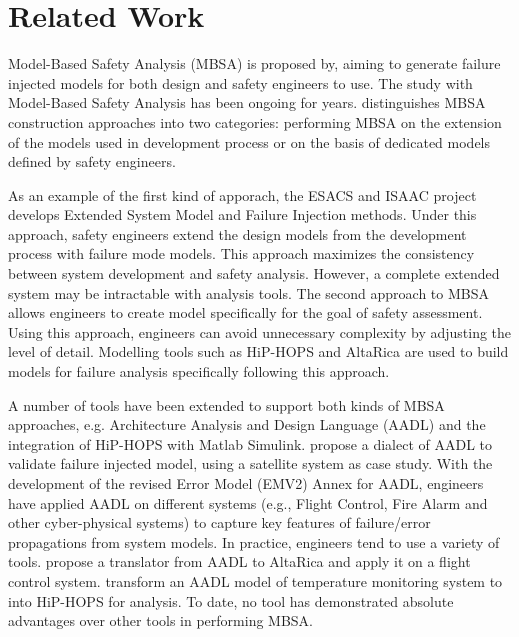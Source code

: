 \section{Related Work}
Model-Based Safety Analysis (MBSA) is proposed by\cite{mbsa05}, aiming to generate failure injected models for both design and safety engineers to use. The study with Model-Based Safety Analysis has been ongoing for years. \cite{mbsa11} distinguishes MBSA construction approaches into two categories: performing MBSA on the extension of the models used in development process or on the basis of dedicated models defined by safety engineers.

As an example of the first kind of apporach, the ESACS and ISAAC project develops Extended System Model and Failure Injection methods\cite{erts06,esrel03}. Under this approach, safety engineers extend the design models from the development process with failure mode models. This approach maximizes the consistency between system development and safety analysis. However, a complete extended system may be intractable with analysis tools. The second approach to MBSA allows engineers to create model specifically for the goal of safety assessment. Using this approach, engineers can avoid unnecessary complexity by adjusting the level of detail. Modelling tools such as HiP-HOPS and AltaRica are used to build models for failure analysis specifically following this approach. 



A number of tools have been extended to support both kinds of MBSA approaches, e.g. Architecture Analysis and Design Language (AADL)\cite{cmu07,sae11} and the integration of HiP-HOPS with Matlab Simulink\cite{dsn01}. \cite{aadl13} propose a dialect of AADL to validate failure injected model, using a satellite system as case study. With the development of the revised Error Model (EMV2) Annex\cite{aadlemv2} for AADL, engineers have applied AADL on different systems (e.g., Flight Control\cite{field1}, Fire Alarm\cite{field2} and other cyber-physical systems\cite{field3}) to capture key features of failure/error propagations from system models. In practice, engineers tend to use a variety of tools. \cite{aadl_altarica} propose a translator from AADL to AltaRica and apply it on a flight control system.\cite{aadl_hiphop} transform an AADL model of temperature monitoring system to into HiP-HOPS for analysis. To date, no tool has demonstrated absolute advantages over other tools in performing MBSA.
